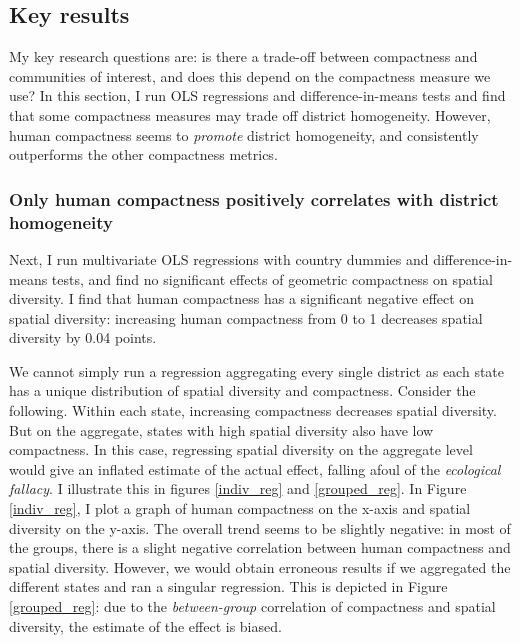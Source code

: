 \documentclass[]{article}
\begin{document}
\hypertarget{key-results}{%
\subsection{Key results}\label{key-results}}

My key research questions are: is there a trade-off between compactness
and communities of interest, and does this depend on the compactness
measure we use? In this section, I run OLS regressions and
difference-in-means tests and find that some compactness measures may
trade off district homogeneity. However, human compactness seems to
\emph{promote} district homogeneity, and consistently outperforms the
other compactness metrics.

\hypertarget{only-human-compactness-positively-correlates-with-district-homogeneity}{%
\subsubsection{Only human compactness positively correlates with
district
homogeneity}\label{only-human-compactness-positively-correlates-with-district-homogeneity}}

Next, I run multivariate OLS regressions with country dummies and
difference-in-means tests, and find no significant effects of geometric
compactness on spatial diversity. I find that human compactness has a
significant negative effect on spatial diversity: increasing human
compactness from 0 to 1 decreases spatial diversity by 0.04 points.

We cannot simply run a regression aggregating every single district as
each state has a unique distribution of spatial diversity and
compactness. Consider the following. Within each state, increasing
compactness decreases spatial diversity. But on the aggregate, states
with high spatial diversity also have low compactness. In this case,
regressing spatial diversity on the aggregate level would give an
inflated estimate of the actual effect, falling afoul of the
\emph{ecological fallacy}. I illustrate this in figures \ref{indiv_reg}
and \ref{grouped_reg}. In Figure \ref{indiv_reg}, I plot a graph of
human compactness on the x-axis and spatial diversity on the y-axis. The
overall trend seems to be slightly negative: in most of the groups,
there is a slight negative correlation between human compactness and
spatial diversity. However, we would obtain erroneous results if we
aggregated the different states and ran a singular regression. This is
depicted in Figure \ref{grouped_reg}: due to the \emph{between-group}
correlation of compactness and spatial diversity, the estimate of the
effect is biased.
\end{document}

